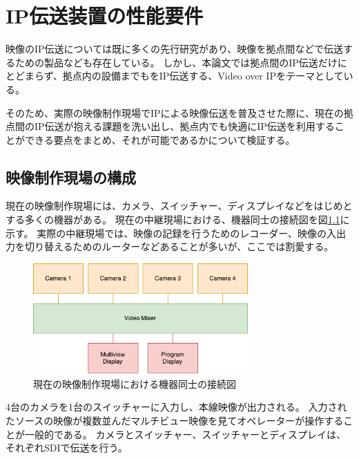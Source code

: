 \chapter{IP伝送装置の性能要件}
\label{chap:network-transmission}

映像のIP伝送については既に多くの先行研究があり、映像を拠点間などで伝送するための製品なども存在している。
しかし、本論文では拠点間のIP伝送だけにとどまらず、拠点内の設備までもをIP伝送する、Video over IPをテーマとしている。

そのため、実際の映像制作現場でIPによる映像伝送を普及させた際に、現在の拠点間のIP伝送が抱える課題を洗い出し、拠点内でも快適にIP伝送を利用することができる要点をまとめ、それが可能であるかについて検証する。

\section{映像制作現場の構成}

現在の映像制作現場には、カメラ、スイッチャー、ディスプレイなどをはじめとする多くの機器がある。
現在の中継現場における、機器同士の接続図を図\ref{fig:broadcast-diagram-on-sdi}に示す。
実際の中継現場では、映像の記録を行うためのレコーダー、映像の入出力を切り替えるためのルーターなどあることが多いが、ここでは割愛する。

\begin{figure}[htbp]
  \begin{center}
    \includegraphics[bb=0 0 432 222,width=8.233cm]{img/broadcast-diagram-on-sdi.pdf}
  \end{center}
  \caption{現在の映像制作現場における機器同士の接続図}
  \label{fig:broadcast-diagram-on-sdi}
\end{figure}

4台のカメラを1台のスイッチャーに入力し、本線映像が出力される。
入力されたソースの映像が複数並んだマルチビュー映像を見てオペレーターが操作することが一般的である。
カメラとスイッチャー、スイッチャーとディスプレイは、それぞれSDIで伝送を行う。

